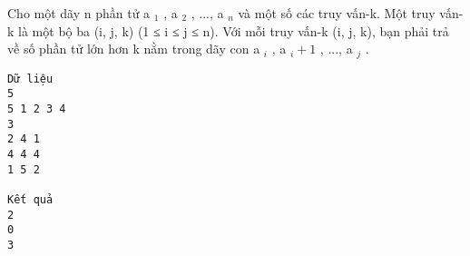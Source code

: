 Cho một dãy n phần tử a   $_    1   $   ,   a   $_    2   $   , ..., a   $_    n   $   và một số các truy vấn-k. Một truy vấn-k là một bộ ba (i, j, k) (1 ≤ i ≤ j ≤ n). Với mỗi truy vấn-k (i, j, k), bạn phải trả về số phần tử lớn hơn k nằm trong dãy con a   $_    i   $   ,   a   $_    i+1   $   , ..., a   $_    j   $   .
\begin{verbatim}
Dữ liệu
5
5 1 2 3 4
3
2 4 1
4 4 4
1 5 2 

Kết quả
2
0
3 
\end{verbatim}